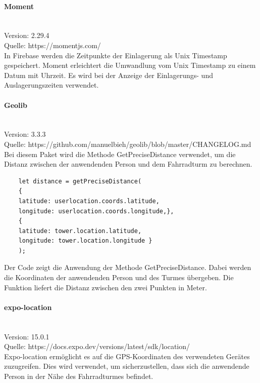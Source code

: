 \paragraph{Moment}\mbox{}\\
Version: 2.29.4\\ Quelle: https://momentjs.com/\\ 
In Firebase werden die Zeitpunkte der Einlagerung als Unix Timestamp gespeichert. Moment erleichtert die Umwandlung vom Unix Timestamp zu einem Datum mit Uhrzeit. Es wird bei der Anzeige der Einlagerungs- und Auslagerungszeiten verwendet. \\  

\paragraph{Geolib}\mbox{}\\
Version: 3.3.3\\ Quelle: https://github.com/manuelbieh/geolib/blob/master/CHANGELOG.md\\ 
Bei diesem Paket wird die Methode GetPreciseDistance verwendet, um die Distanz zwischen der anwendenden Person und dem Fahrradturm zu berechnen. \\
\begin{verbatim}
    let distance = getPreciseDistance(
    {
    latitude: userlocation.coords.latitude,
    longitude: userlocation.coords.longitude,},
    { 
    latitude: tower.location.latitude, 
    longitude: tower.location.longitude }
    );
\end{verbatim}
Der Code zeigt die Anwendung der Methode GetPreciseDistance. Dabei werden die Koordinaten der anwendenden Person und des Turmes übergeben. Die Funktion liefert die Distanz zwischen den zwei Punkten in Meter.

\paragraph{expo-location}\mbox{}\\
Version: 15.0.1\\
Quelle: https://docs.expo.dev/versions/latest/sdk/location/ \\
Expo-location ermöglicht es auf die GPS-Koordinaten des verwendeten Gerätes zuzugreifen. Dies wird verwendet, um sicherzustellen, dass sich die anwendende Person in der Nähe des Fahrradturmes befindet. \\


